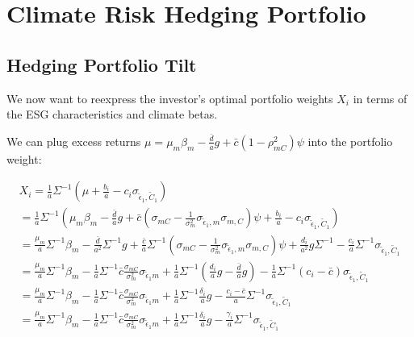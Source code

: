 \section{Climate Risk Hedging Portfolio}

\subsection{Hedging Portfolio Tilt}

We now want to reexpress the investor's optimal 
portfolio weights $X_i$ in terms of 
the ESG characteristics and climate betas.

We can plug excess returns $\mu = \mu_m \beta_m - \frac{\bar{d}}{a}g + \bar{c}(1 - \rho^2_{mC}) \psi$
into the portfolio weight:

\begin{equation}
    \begin{aligned}
        X_i = \frac{1}{a}\Sigma^{-1} ( \mu + \frac{b_i}{a} - c_i \sigma_{\tilde{\epsilon}_1, \tilde{C}_1}) \\
        = \frac{1}{a} \Sigma^{-1}( \mu_m \beta_m - \frac{\bar{d}}{a}g + \bar{c}(\sigma_{mC} -  \frac{1}{\sigma^2_m}\sigma_{\tilde{\epsilon}_1, m} \sigma_{m, C}) \psi + \frac{b_i}{a} - c_i \sigma_{\tilde{\epsilon}_1, \tilde{C}_1}) \\
        = \frac{\mu_m}{a} \Sigma^{-1} \beta_m - \frac{\bar{d}}{a^2} \Sigma^{-1} g + \frac{\bar{c}}{a} \Sigma^{-1} (\sigma_{mC} -  \frac{1}{\sigma^2_m}\sigma_{\tilde{\epsilon}_1, m} \sigma_{m, C}) \psi + \frac{d_i}{a^2}g\Sigma^{-1} - \frac{c_i}{a} \Sigma^{-1} \sigma_{\tilde{\epsilon}_1, \tilde{C}_1} \\
        = \frac{\mu_m}{a} \Sigma^{-1} \beta_m - \frac{1}{a} \Sigma^{-1} \bar{c} \frac{\sigma_{mC}}{\sigma_m^2} \sigma_{\tilde{\epsilon}_1 m} + \frac{1}{a} \Sigma^{-1} (\frac{d_i}{a}g - \frac{\bar{d}}{a}g) - \frac{1}{a} \Sigma^{-1} (c_i - \bar{c})\sigma_{\tilde{\epsilon}_1, \tilde{C}_1} \\
        = \frac{\mu_m}{a} \Sigma^{-1} \beta_m - \frac{1}{a} \Sigma^{-1} \bar{c} \frac{\sigma_{mC}}{\sigma_m^2} \sigma_{\tilde{\epsilon}_1 m} + \frac{1}{a} \Sigma^{-1} \frac{\delta_i}{a}g - \frac{c_i - \bar{c}}{a} \Sigma^{-1} \sigma_{\tilde{\epsilon}_1, \tilde{C}_1} \\
        = \frac{\mu_m}{a} \Sigma^{-1} \beta_m - \frac{1}{a} \Sigma^{-1} \bar{c} \frac{\sigma_{mC}}{\sigma_m^2} \sigma_{\tilde{\epsilon}_1 m} + \frac{1}{a} \Sigma^{-1} \frac{\delta_i}{a}g - \frac{\gamma_i}{a} \Sigma^{-1} \sigma_{\tilde{\epsilon}_1, \tilde{C}_1} \\
    \end{aligned}
\end{equation}

